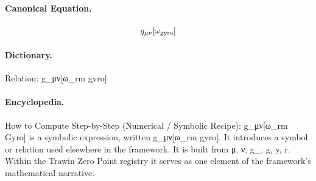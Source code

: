 \paragraph{Canonical Equation.}
\[
g_{\mu\nu}[\omega_{\rm gyro}]
\]

\paragraph{Dictionary.}
Relation: g\_μν[ω\_rm gyro]

\paragraph{Encyclopedia.}
How to Compute Step-by-Step (Numerical / Symbolic Recipe): g\_μν[ω\_rm Gyro] is a symbolic expression, written g\_μν[ω\_rm gyro]. It introduces a symbol or relation used elsewhere in the framework. It is built from μ, ν, g\_, g, y, r. Within the Trawin Zero Point registry it serves as one element of the framework's mathematical narrative.
